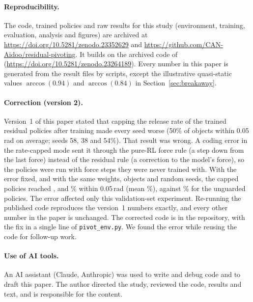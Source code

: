 \documentclass[11pt]{article}
\begin{document}
\paragraph{Reproducibility.} The code, trained policies and raw results for this study (environment, training, evaluation, analysis and figures) are archived at \url{https://doi.org/10.5281/zenodo.23352629} and \url{https://github.com/CAN-Aidoo/residual-pivoting}. It builds on the archived code of \cite{aidoo2026a} (\url{https://doi.org/10.5281/zenodo.23264189}). Every number in this paper is generated from the result files by scripts, except the illustrative quasi-static values $\arccos(0.94)$ and $\arccos(0.84)$ in Section~\ref{sec:breakaway}.

\paragraph{Correction (version 2).} Version~1 of this paper stated that capping the release rate of the trained residual policies after training made every seed worse (50\% of objects within 0.05\,rad on average; seeds 58, 38 and 54\%). That result was wrong. A coding error in the rate-capped mode sent it through the pure-RL force rule (a step down from the last force) instead of the residual rule (a correction to the model's force), so the policies were run with force steps they were never trained with. With the error fixed, and with the same weights, objects and random seeds, the capped policies reached \VResRFivea, \VResRFiveb{} and \VResRFivec\% within 0.05\,rad (mean \VResRFive\%), against \VResFive\% for the unguarded policies. The error affected only this validation-set experiment. Re-running the published code reproduces the version~1 numbers exactly, and every other number in the paper is unchanged. The corrected code is in the repository, with the fix in a single line of \texttt{pivot\_env.py}. We found the error while reusing the code for follow-up work.

\paragraph{Use of AI tools.} An AI assistant (Claude, Anthropic) was used to write and debug code and to draft this paper. The author directed the study, reviewed the code, results and text, and is responsible for the content.
\end{document}
